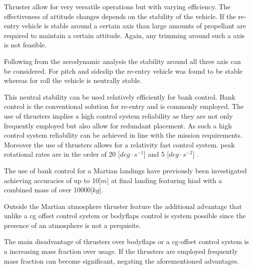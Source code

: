 Thruster allow for very versatile operations but with varying efficiency. The effectiveness of attitude changes depends on the stability of the vehicle. If the re-entry vehicle is stable around a certain axis than large amounts of propellant are required to maintain a certain attitude. Again, any trimming around such a axis is not feasible.

Following from the aerodynamic analysis the stability around all three axis can be considered. For pitch and sideslip the re-entry vehicle was found to be stable whereas for roll the vehicle is neutrally stable. 

This neutral stability can be used relatively efficiently for bank control. Bank control is the conventional solution for re-entry and is commonly employed. The use of thrusters implies a high control system reliability \cite{Wertz2011} as they are not only frequently employed but also allow for redundant placement. As such a high control system reliability can be achieved in line with the mission requirements. Moreover the use of thrusters allows for a relativity fast control system. peak rotational rates are in the order of 20 [$deg\cdot s^{-1}$] and 5 [$deg \cdot s^{-2}$] \cite{Davis2010}.

The use of bank control for a Martian landings have previously been investigated \cite{Davis2010} achieving accuracies of up to 10[$m$] at final landing featuring \gls{hiad} with a combined mass of over 10000[$kg$].

Outside the Martian atmosphere thruster feature the additional advantage that unlike a \gls{cg} offset control system or bodyflaps control is system possible since the presence of an atmosphere is not a perquisite.

The main disadvantage of thrusters over bodyflaps or a \gls{cg}-offset control system is a increasing mass fraction over usage. If the thrusters are employed frequently mass fraction can become significant, negating the aforementioned advantages.


